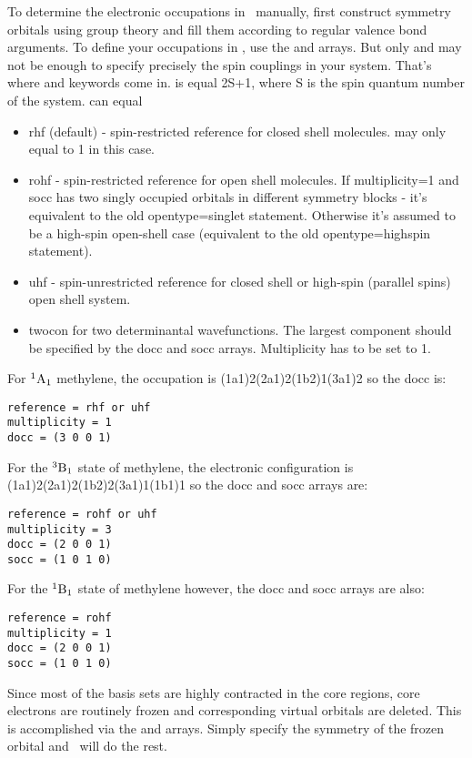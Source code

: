 To determine the electronic occupations in \PSIthree\ manually, first
construct symmetry
orbitals using group theory and fill them according to regular
valence bond arguments. To define your occupations in \PSIthree,
use the  and  arrays. But only 
and  may not be enough to specify precisely
the spin couplings in your system. That's where  and
 keywords come in.  is equal
2S+1, where S is the spin quantum number of the system.  can equal 
\begin{itemize}
\item rhf (default) - spin-restricted reference for closed shell molecules.
 may only equal to 1 in this case.
\item rohf - spin-restricted reference for open shell molecules.
If multiplicity=1 and socc has two singly occupied orbitals in
different symmetry blocks - it's equivalent to the old opentype=singlet statement.
Otherwise it's assumed to be a high-spin open-shell case
(equivalent to the old opentype=highspin statement).
\item uhf - spin-unrestricted reference for closed shell or high-spin (parallel spins) open shell system.
\item twocon for two determinantal wavefunctions. The largest
component should be specified by the docc and socc arrays.
Multiplicity has to be set to 1.
\end{itemize}
For $^1{\rm A}_1$ methylene, the occupation is (1a1)2(2a1)2(1b2)1(3a1)2 so the docc is: 
\begin{verbatim}
reference = rhf or uhf
multiplicity = 1
docc = (3 0 0 1)
\end{verbatim}
For the $^3{\rm B}_1$ state of methylene,
the electronic configuration is (1a1)2(2a1)2(1b2)2(3a1)1(1b1)1 so the docc and socc arrays are: 
\begin{verbatim}
reference = rohf or uhf
multiplicity = 3
docc = (2 0 0 1)
socc = (1 0 1 0)
\end{verbatim}
For the $^1{\rm B}_1$ state of methylene however, the docc and socc arrays are also: 
\begin{verbatim}
reference = rohf
multiplicity = 1
docc = (2 0 0 1)
socc = (1 0 1 0)
\end{verbatim}
Since most of the basis sets are highly contracted in the core regions,
core electrons are routinely frozen and corresponding virtual
orbitals are deleted. This is accomplished via the 
and  arrays. Simply specify the symmetry of
the frozen orbital and \PSIthree\ will do the rest. 

